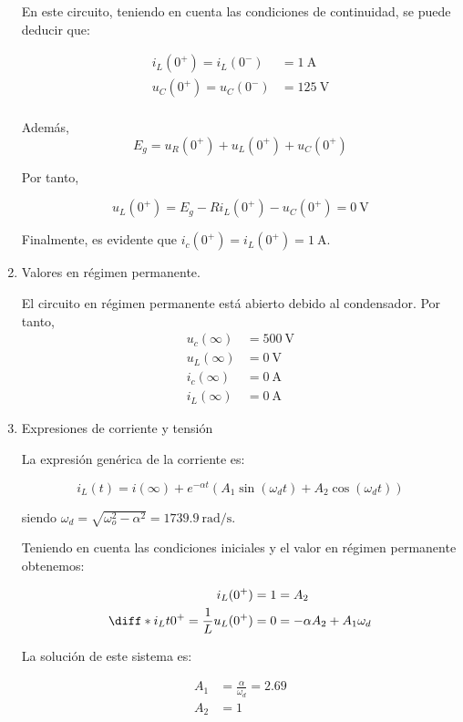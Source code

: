 \documentclass[12pt]{article}
\begin{document}
\begin{enumerate}
  En este circuito, teniendo en cuenta las condiciones de continuidad, se puede deducir que:

  \begin{align*}
    i_L(0^+) = i_L(0^-) &= \SI{1}{\ampere}\\
    u_C(0^+) = u_C(0^-) &= \SI{125}{\volt}\\
  \end{align*}

  Además,
  \[
    E_g = u_R(0^+) + u_L(0^+) + u_C(0^+)
  \]

  Por tanto,

  \[
    u_L(0^+) = E_g - Ri_L(0^+) - u_C(0^+) = \SI{0}{\volt} 
  \]

  Finalmente, es evidente que $i_c(0^+) = i_L(0^+) = \SI{1}{\ampere}$.

\item Valores en régimen permanente.

  El circuito en régimen permanente está abierto debido al condensador. Por tanto,
  \begin{align*}
    u_c(\infty) & = \SI{500}{\volt}\\
    u_L(\infty) & = \SI{0}{\volt}\\
    i_c(\infty) & = \SI{0}{\ampere}\\
    i_L(\infty) & = \SI{0}{\ampere}
  \end{align*}

\item Expresiones de corriente y tensión

  La expresión genérica de la corriente es:

  \[
    i_L(t) = i(\infty) + e^{-\alpha t} \left(A_1 \sin(\omega_d t) + A_2 \cos(\omega_d t)\right)
  \]

  siendo $\omega_d = \sqrt{\omega_o^2 - \alpha^2} = \SI{1739.9}{\radian\per\second}$.
  
  Teniendo en cuenta las condiciones iniciales y el valor en régimen permanente obtenemos:

  \begin{align*}
    i_L(0^+) = 1 &= A_2\\
    \diff*{i_L}{t}{0^+} = \frac{1}{L}u_L(0^+) = 0 &= -\alpha A_2 + A_1 \omega_d
  \end{align*}

  La solución de este sistema es:

  \begin{align*}
    A_1 &= \frac{\alpha}{\omega_d} = 2.69\\
    A_2 &= 1\\
  \end{align*}
  

\end{enumerate}
\end{document}
